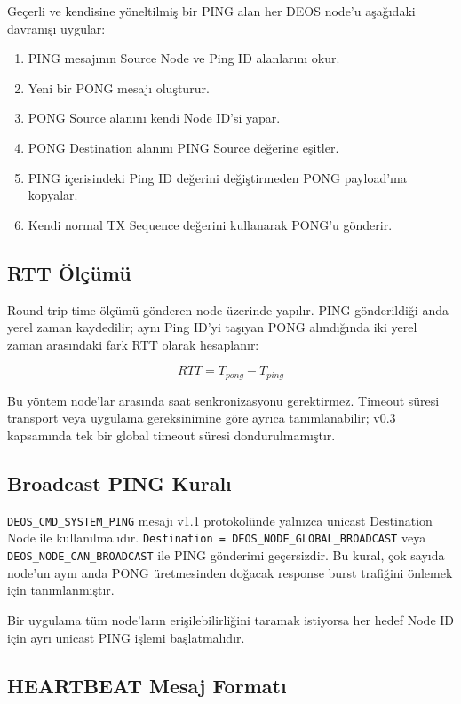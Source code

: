 \documentclass[a4paper,10pt]{article}
\newcommand{\code}[1]{\texttt{#1}}
\begin{document}
Geçerli ve kendisine yöneltilmiş bir PING alan her DEOS node'u aşağıdaki davranışı uygular:

\begin{enumerate}[nosep]
    \item PING mesajının Source Node ve Ping ID alanlarını okur.
    \item Yeni bir PONG mesajı oluşturur.
    \item PONG Source alanını kendi Node ID'si yapar.
    \item PONG Destination alanını PING Source değerine eşitler.
    \item PING içerisindeki Ping ID değerini değiştirmeden PONG payload'ına kopyalar.
    \item Kendi normal TX Sequence değerini kullanarak PONG'u gönderir.
\end{enumerate}

\subsection{RTT Ölçümü}

Round-trip time ölçümü gönderen node üzerinde yapılır. PING gönderildiği anda yerel zaman
kaydedilir; aynı Ping ID'yi taşıyan PONG alındığında iki yerel zaman arasındaki fark RTT
olarak hesaplanır:

\[
RTT = T_{pong} - T_{ping}
\]

Bu yöntem node'lar arasında saat senkronizasyonu gerektirmez. Timeout süresi transport veya
uygulama gereksinimine göre ayrıca tanımlanabilir; v0.3 kapsamında tek bir global timeout
süresi dondurulmamıştır.

\subsection{Broadcast PING Kuralı}

\code{DEOS\_CMD\_SYSTEM\_PING} mesajı v1.1 protokolünde yalnızca unicast Destination Node
ile kullanılmalıdır. \code{Destination = DEOS\_NODE\_GLOBAL\_BROADCAST} veya \code{DEOS\_NODE\_CAN\_BROADCAST} ile PING gönderimi geçersizdir.
Bu kural, çok sayıda node'un aynı anda PONG üretmesinden doğacak response burst trafiğini
önlemek için tanımlanmıştır.

Bir uygulama tüm node'ların erişilebilirliğini taramak istiyorsa her hedef Node ID için ayrı
unicast PING işlemi başlatmalıdır.

\subsection{HEARTBEAT Mesaj Formatı}
\end{document}
